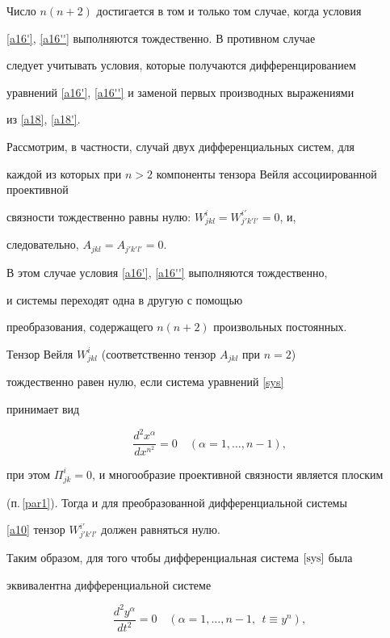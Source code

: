 Число $n(n+2)$ достигается в том и только том случае, когда условия


\eqref{a16'}, \eqref{a16''} выполняются тождественно. В противном случае


следует учитывать условия, которые получаются дифференцированием


уравнений \eqref{a16'}, \eqref{a16''} и заменой первых производных выражениями


из \eqref{a18}, \eqref{a18'}.





Рассмотрим, в частности, случай двух дифференциальных систем, для


каждой из которых при $n>2$ компоненты тензора Вейля ассоциированной проективной


связности тождественно равны нулю: $W^i_{jkl}=W^{i'}_{j'k'l'}=0$, и,


следовательно, $A_{jkl}=A_{j'k'l'}=0$.


В этом случае условия \eqref{a16'}, \eqref{a16''} выполняются тождественно,


и системы переходят одна в другую с помощью


преобразования, содержащего $n(n+2)$ произвольных постоянных.





Тензор Вейля $W^i_{jkl}$ (соответственно тензор $A_{jkl}$ при $n=2$)


тождественно равен нулю, если система уравнений \eqref{sys}


принимает вид


$$


\frac{d^2x^\alpha}{dx^{n^2}}=0


\quad (\alpha=1,\dotsc,n-1),


$$


при этом $\Pi^i_{jk}=0$, и многообразие проективной связности является плоским


(п.\,\ref{par1}). Тогда и для преобразованной дифференциальной системы


\eqref{a10} тензор $W^{i'}_{j'k'l'}$ должен равняться нулю.


Таким образом, для того чтобы дифференциальная система $\eqref{sys}$ была


эквивалентна дифференциальной системе


\begin{equation}\label{a19}


\frac{d^2y^\alpha}{dt^2}=0


\quad (\alpha=1,\dotsc,n-1,\ \ t\equiv y^n),


\end{equation}


